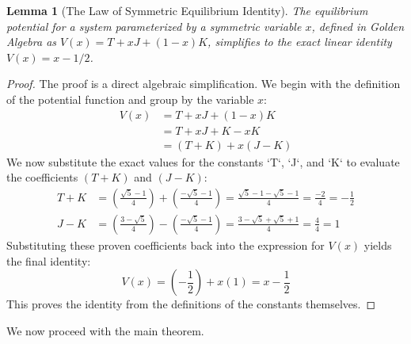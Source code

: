 \documentclass{amsart}
\theoremstyle{plain}
\newtheorem{lemma}[theorem]{Lemma}
\theoremstyle{definition}
\theoremstyle{remark}
\begin{document}
\begin{lemma}[The Law of Symmetric Equilibrium Identity]
The equilibrium potential for a system parameterized by a symmetric variable $x$, defined in Golden Algebra as $V(x) = T + xJ + (1-x)K$, simplifies to the exact linear identity $V(x) = x - 1/2$.
\end{lemma}
\begin{proof}
The proof is a direct algebraic simplification. We begin with the definition of the potential function and group by the variable $x$:
\begin{align*}
    V(x) &= T + xJ + (1-x)K \\
         &= T + xJ + K - xK \\
         &= (T + K) + x(J - K)
\end{align*}
We now substitute the exact values for the constants `T`, `J`, and `K` to evaluate the coefficients $(T+K)$ and $(J-K)$:
\begin{align*}
    T+K &= \left(\frac{\sqrt{5}-1}{4}\right) + \left(\frac{-\sqrt{5}-1}{4}\right) = \frac{\sqrt{5}-1-\sqrt{5}-1}{4} = \frac{-2}{4} = -\frac{1}{2} \\
    J-K &= \left(\frac{3-\sqrt{5}}{4}\right) - \left(\frac{-\sqrt{5}-1}{4}\right) = \frac{3-\sqrt{5}+\sqrt{5}+1}{4} = \frac{4}{4} = 1
\end{align*}
Substituting these proven coefficients back into the expression for $V(x)$ yields the final identity:
\begin{equation*}
    V(x) = \left(-\frac{1}{2}\right) + x(1) = x - \frac{1}{2}
\end{equation*}
This proves the identity from the definitions of the constants themselves.
\end{proof}

We now proceed with the main theorem.
\end{document}
